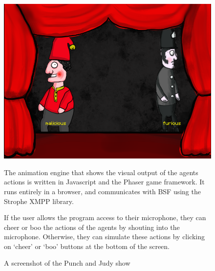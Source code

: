 \documentclass[11pt]{report}
\begin{document}

\begin{figure}[!t]
\begin{minipage}{0.56\textwidth}
\includegraphics[width=\textwidth]{punchjudy.png}
\end{minipage}\hfill%
\begin{minipage}{0.4\textwidth}
The animation engine that shows the visual output of the agents actions is written in Javascript and the Phaser game framework. It runs entirely in a browser, and communicates with BSF using the Strophe XMPP library.

If the user allows the program access to their microphone, they can cheer or boo the actions of the agents by shouting into the microphone. Otherwise, they can simulate these actions by clicking on `cheer' or `boo' buttons at the bottom of the screen.
\end{minipage}
\caption{A screenshot of the Punch and Judy show} \label{fig:pjshow}
\end{figure}
\end{document}
